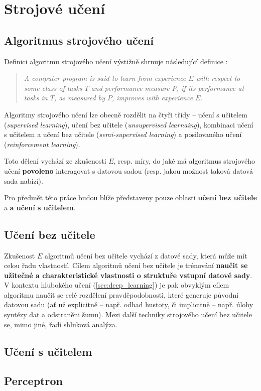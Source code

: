 \section{Strojové učení}
\subsection{Algoritmus strojového učení}
\label{sec:machine_learning}
Definici algoritmu strojového učení výstižně shrnuje následující definice \cite[str. 2]{Mitchell1997}:
\blockquote{\emph{A computer program is said to learn from experience $E$ with respect to some class of tasks $T$ and performance measure $P$, if its performance at tasks in $T$, as measured by $P$, improves with experience $E$.}}

Algoritmy strojového učení lze obecně rozdělit na čtyři třídy – učení s učitelem (\emph{supervised learning}),
učení bez učitele (\emph{unsupervised learnaing}), kombinaci učení s učitelem a učení bez učitele (\emph{semi-supervised learning}) a posilovaného učení (\emph{reinforcement learning}).

Toto dělení vychází ze zkušenosti $E$, resp. míry, do jaké má algoritmus strojového učení \textbf{povoleno} interagovat s datovou sadou (resp. jakou možnost taková datová sada nabízí). \cite{Goodfellow2016}

Pro předmět této práce budou blíže představeny pouze oblasti \textbf{učení bez učitele} a \textbf{a učení s učitelem}.
\subsection{Učení bez učitele}
Zkušenost $E$ algoritmů učení bez učitele vychází z datové sady, která může mít celou řadu vlastností.
Cílem algoritmů učení bez učitele je trénování \textbf{naučit se užitečné a charakteristické vlastnosti o struktuře vstupní datové sady}.
V kontextu hlubokého učení (\autoref{sec:deep_learning}) je pak obvyklým cílem algoritmu naučit se celé rozdělení pravděpodobnosti, které generuje původní datovou sadu (ať už explicitně – např. odhad hustoty, či implicitně – např. úlohy syntézy dat a odstraněni šumu).
Mezi další techniky strojového učení bez učitele se, mimo jiné, řadí shluková analýza.
\subsection{Učení s učitelem}
\subsection{Perceptron}

